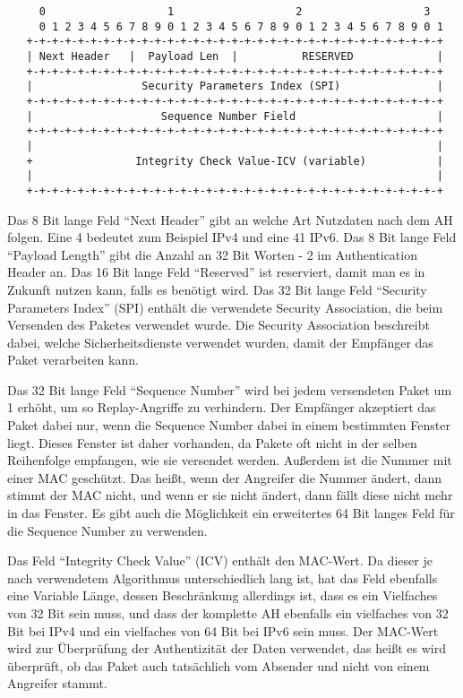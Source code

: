\documentclass[12pt]{scrartcl}
\begin{document}
\begin{addmargin}[-2em]{0em}
\begin{verbatim}
     0                   1                   2                   3
     0 1 2 3 4 5 6 7 8 9 0 1 2 3 4 5 6 7 8 9 0 1 2 3 4 5 6 7 8 9 0 1
   +-+-+-+-+-+-+-+-+-+-+-+-+-+-+-+-+-+-+-+-+-+-+-+-+-+-+-+-+-+-+-+-+
   | Next Header   |  Payload Len  |          RESERVED             |
   +-+-+-+-+-+-+-+-+-+-+-+-+-+-+-+-+-+-+-+-+-+-+-+-+-+-+-+-+-+-+-+-+
   |                 Security Parameters Index (SPI)               |
   +-+-+-+-+-+-+-+-+-+-+-+-+-+-+-+-+-+-+-+-+-+-+-+-+-+-+-+-+-+-+-+-+
   |                    Sequence Number Field                      |
   +-+-+-+-+-+-+-+-+-+-+-+-+-+-+-+-+-+-+-+-+-+-+-+-+-+-+-+-+-+-+-+-+
   |                                                               |
   +                Integrity Check Value-ICV (variable)           |
   |                                                               |
   +-+-+-+-+-+-+-+-+-+-+-+-+-+-+-+-+-+-+-+-+-+-+-+-+-+-+-+-+-+-+-+-+
  \end{verbatim}
\end{addmargin}
Das 8 Bit lange Feld "`Next Header"' gibt an welche Art Nutzdaten nach dem AH folgen. Eine 4 bedeutet zum Beispiel IPv4 und eine 41 IPv6. Das 8 Bit lange Feld "`Payload Length"' gibt die Anzahl an 32 Bit Worten - 2 im Authentication Header an. Das 16 Bit lange Feld "`Reserved"' ist reserviert, damit man es in Zukunft nutzen kann, falls es benötigt wird. Das 32 Bit lange Feld "`Security Parameters Index"' (SPI) enthält die verwendete Security Association, die beim Versenden des Paketes verwendet wurde. Die Security Association beschreibt dabei, welche Sicherheitsdienste verwendet wurden, damit der Empfänger das Paket verarbeiten kann. 

Das 32 Bit lange Feld "`Sequence Number"' wird bei jedem versendeten Paket um 1 erhöht, um so Replay-Angriffe zu verhindern. Der Empfänger akzeptiert das Paket dabei nur, wenn die Sequence Number dabei in einem bestimmten Fenster liegt. Dieses Fenster ist daher vorhanden, da Pakete oft nicht in der selben Reihenfolge empfangen, wie sie versendet werden. Außerdem ist die Nummer mit einer MAC geschützt. Das heißt, wenn der Angreifer die Nummer ändert, dann stimmt der MAC nicht, und wenn er sie nicht ändert, dann fällt diese nicht mehr in das Fenster. Es gibt auch die Möglichkeit ein erweitertes 64 Bit langes Feld für die Sequence Number zu verwenden. 

Das Feld "`Integrity Check Value"' (ICV) enthält den MAC-Wert. Da dieser je nach verwendetem Algorithmus unterschiedlich lang ist, hat das Feld ebenfalls eine Variable Länge, dessen Beschränkung allerdings ist, dass es ein Vielfaches von 32 Bit sein muss, und dass der komplette AH ebenfalls ein vielfaches von 32 Bit bei IPv4 und ein vielfaches von 64 Bit bei IPv6 sein muss. Der MAC-Wert wird zur Überprüfung der Authentizität der Daten verwendet, das heißt es wird überprüft, ob das Paket auch tatsächlich vom Absender und nicht von einem Angreifer stammt.
\end{document}
